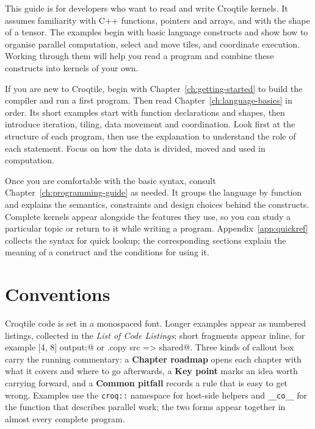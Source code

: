 This guide is for developers who want to read and write Croqtile kernels.
It assumes familiarity with C++ functions, pointers and arrays, and with
the shape of a tensor. The examples begin with basic language constructs
and show how to organise parallel computation, select and move tiles, and
coordinate execution. Working through them will help you read a
 program and combine these constructs into kernels of your own.

If you are new to Croqtile, begin with Chapter~\ref{ch:getting-started} to
build the compiler and run a first program. Then read
Chapter~\ref{ch:language-basics} in order. Its short examples start with
function declarations and shapes, then introduce iteration, tiling, data
movement and coordination. Look first at the structure of each program,
then use the explanation to understand the role of each statement. Focus
on how the data is divided, moved and used in computation.

Once you are comfortable with the basic syntax, consult
Chapter~\ref{ch:programming-guide} as needed. It groups the language by
function and explains the semantics, constraints and design choices behind
the constructs. Complete kernels appear alongside the features they use,
so you can study a particular topic or return to it while writing a
program. Appendix~\ref{app:quickref} collects the syntax for quick lookup;
the corresponding sections explain the meaning of a construct and the
conditions for using it.

\section*{Conventions}

Croqtile code is set in a monospaced font. Longer examples appear as
numbered listings, collected in the \emph{List of Code Listings}; short
fragments appear inline, for example  [4, 8] output;@ or
\co@dma.copy src => shared@. Three kinds of callout box carry the running
commentary: a \textbf{Chapter roadmap} opens each chapter with what it
covers and where to go afterwards, a \textbf{Key point} marks an idea worth
carrying forward, and a \textbf{Common pitfall} records a rule that is easy
to get wrong. Examples use the \texttt{croq::} namespace for host-side
helpers and \texttt{\_\_co\_\_} for the function that describes parallel
work; the two forms appear together in almost every complete program.

\cleardoublepage
\tableofcontents
\cleardoublepage
\lstlistoflistings
\cleardoublepage
